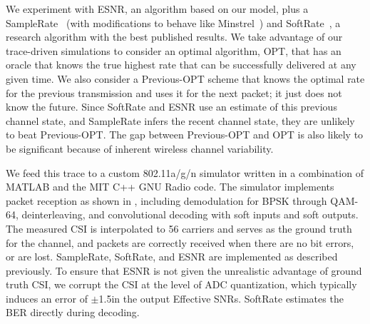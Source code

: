  We experiment with ESNR, an algorithm based on our model, plus a SampleRate~\cite{Bicket_SampleRate} (with modifications to behave like Minstrel~\cite{minstrel}) and SoftRate~\cite{Vutukuru_SoftRate}, a research algorithm with the best published results. We take advantage of our trace-driven simulations to consider an optimal algorithm, OPT, that has an oracle that knows the true highest rate that can be successfully delivered at any given time. We also consider a Previous-OPT scheme that knows the optimal rate for the previous transmission and uses it for the next packet; it just does not know the future. Since SoftRate and ESNR use an estimate of this previous channel state, and SampleRate infers the recent channel state, they are unlikely to beat Previous-OPT\@. The gap between Previous-OPT and OPT is also likely to be significant because of inherent wireless channel variability.

 We feed this trace to a custom 802.11a/g/n simulator written in a combination of MATLAB and the MIT C++ GNU Radio code. The simulator implements packet reception as shown in , including demodulation for BPSK through QAM-64, deinterleaving, and convolutional decoding with soft inputs and soft outputs. The measured CSI is interpolated to 56 carriers and serves as the ground truth for the channel, and packets are correctly received when there are no bit errors, or are lost. SampleRate, SoftRate, and ESNR are implemented as described previously. To ensure that ESNR is not given the unrealistic advantage of ground truth CSI, we corrupt the CSI at the level of ADC quantization, which typically induces an error of $\pm$1.5\dB in the output Effective SNRs. SoftRate estimates the BER directly during decoding.

